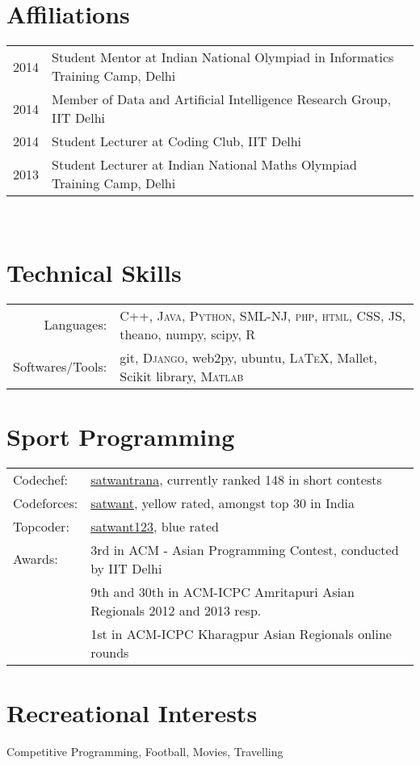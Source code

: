 \documentclass[margin,line]{res}
\begin{document}
\begin{resume}
\section{\sc Affiliations} 
\begin{tabular}{rl}
2014 & Student Mentor at Indian National Olympiad in Informatics Training Camp, Delhi\\
2014 & Member of Data and Artificial Intelligence Research Group, IIT Delhi \\
2014 & Student Lecturer at Coding Club, IIT Delhi\\
2013 & Student Lecturer at Indian National Maths Olympiad Training Camp, Delhi\\
\end{tabular}\\

\section{\sc Technical Skills}

\begin{tabular}{rl}
Languages: & \textsc{C++}, \textsc{Java}, \textsc{Python}, \textsc{SML-NJ}, \textsc{php}, \textsc{html}, \textsc{CSS}, \textsc{JS}, theano, numpy, scipy, R\\

Softwares/Tools: & git, \textsc{Django}, web2py, ubuntu, \textsc{LaTeX}, Mallet, Scikit library,  \textsc{Matlab}\\

\end{tabular}

\section{\sc Sport Programming}

\begin{tabular}{ll}
Codechef: & \href{http://www.codechef.com/users/satwantrana}{satwantrana}, currently ranked 148 in short contests\\
Codeforces: & \href{http://codeforces.com/profile/satwant}{satwant}, yellow rated, amongst top 30 in India\\
Topcoder: & \href{http://community.topcoder.com/tc?module=MemberProfile&cr=23152984}{satwant123}, blue rated\\
Awards: & 3rd in ACM - Asian Programming Contest, conducted by IIT Delhi\\
& 9th and 30th in ACM-ICPC Amritapuri Asian Regionals 2012 and 2013 resp.\\
& 1st in ACM-ICPC Kharagpur Asian Regionals online rounds

\end{tabular}

\section{\sc Recreational Interests}
Competitive Programming, Football, Movies, Travelling

\end{resume}
\end{document}

